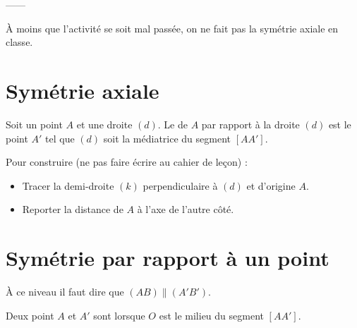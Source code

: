 


------

À moins que l'activité se soit mal passée, on ne fait pas la symétrie axiale en classe.

\section*{Symétrie axiale}

\begin{definition}
    Soit un point \( A\) et une droite \( (d)\). Le  de \( A\) par rapport à la droite \( (d)\) est le point \( A'\) tel que \( (d)\) soit la médiatrice du segment \( [AA']\).
\end{definition}

Pour construire (ne pas faire écrire au cahier de leçon) :
\begin{itemize}
    \item Tracer la demi-droite \( (k)\) perpendiculaire à \( (d)\) et d'origine \( A\).
    \item Reporter la distance de \( A\) à l'axe de l'autre côté.
\end{itemize}

\section{Symétrie par rapport à un point}



À ce niveau il faut dire que \( (AB)\parallel (A'B')\).

\begin{definition}
    Deux point \( A\) et \( A'\) sont  lorsque \( O\) est le milieu du segment \( [AA']\). 
\end{definition}


